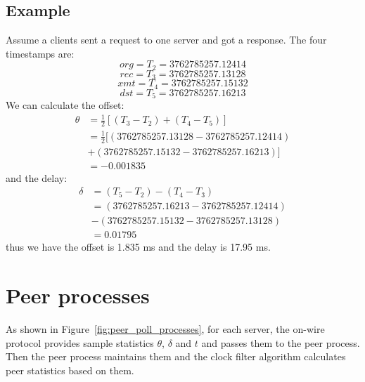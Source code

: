 \subsection{Example}%
\label{sub:example}
Assume a clients sent a request to one server and got a response. The four
timestamps are:
$$
\textit{org} = T_2 = 3762785257.12414
$$
$$
\textit{rec} = T_3 = 3762785257.13128 
$$
$$
\textit{xmt} = T_4 = 3762785257.15132
$$
$$
\textit{dst} = T_5 = 3762785257.16213 
$$
We can calculate the offset:
\begin{align*}
\theta & = \frac{1}{2}\left[(T_3 - T_2) + (T_4 - T_5)\right]\\
       & = \frac{1}{2}[(3762785257.13128 - 3762785257.12414) \\
       & + (3762785257.15132 - 3762785257.16213)]\\
       & = -0.001835
\end{align*}
and the delay:
\begin{align*}
\delta & = (T_5 - T_2) - (T_4 - T_3) \\
       & = (3762785257.16213 - 3762785257.12414) \\
       & - (3762785257.15132 - 3762785257.13128) \\
       & = 0.01795
\end{align*}
thus we have the offset is 1.835 ms and the delay is 17.95 ms.

\section{Peer processes}%
\label{sec:peer_processes}
As shown in Figure~\ref{fig:peer_poll_processes}, 
for each server, the on-wire protocol provides sample statistics $\theta$,
$\delta$ and $t$ and passes them to the peer process. Then the peer process
maintains them and the clock filter algorithm calculates peer statistics based
on them.

